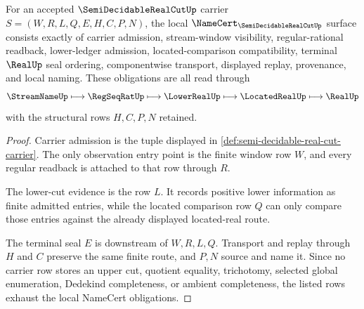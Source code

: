 \begin{theorem}
\label{thm:semi-decidable-real-cut-obligation-surface}
For an accepted $\SemiDecidableRealCutUp$ carrier $S=(W,R,L,Q,E,H,C,P,N)$, the local $\NameCert_{\SemiDecidableRealCutUp}$ surface consists exactly of carrier admission, stream-window visibility, regular-rational readback, lower-ledger admission, located-comparison compatibility, terminal $\RealUp$ seal ordering, componentwise transport, displayed replay, provenance, and local naming. These obligations are all read through
$$
\StreamNameUp \longmapsto \RegSeqRatUp \longmapsto \LowerRealUp \longmapsto \LocatedRealUp \longmapsto \RealUp
$$
with the structural rows $H,C,P,N$ retained.
\end{theorem}
\begin{proof}
Carrier admission is the tuple displayed in \autoref{def:semi-decidable-real-cut-carrier}. The only observation entry point is the finite window row $W$, and every regular readback is attached to that row through $R$.

The lower-cut evidence is the row $L$. It records positive lower information as finite admitted entries, while the located comparison row $Q$ can only compare those entries against the already displayed located-real route.

The terminal seal $E$ is downstream of $W,R,L,Q$. Transport and replay through $H$ and $C$ preserve the same finite route, and $P,N$ source and name it. Since no carrier row stores an upper cut, quotient equality, trichotomy, selected global enumeration, Dedekind completeness, or ambient completeness, the listed rows exhaust the local NameCert obligations.
\end{proof}

